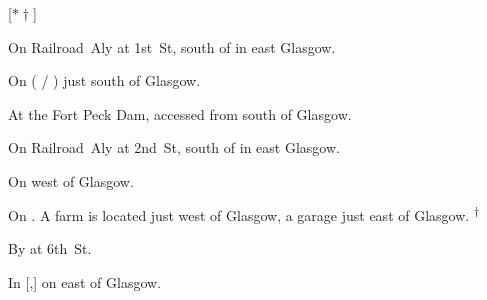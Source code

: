 
[$\ast\dagger$]

\begin{LocationList}

On Railroad~Aly at 1st~St, south of  in east Glasgow.

On  ( / ) just south of Glasgow.

At the Fort Peck Dam, accessed from 
south of Glasgow.

On Railroad~Aly at 2nd~St, south of  in east Glasgow.

\Location{\RestArea \Rest}
On 
west of Glasgow.

On .
A farm is located just west of Glasgow, a garage just east of Glasgow.%
\textsuperscript{\scriptsize $\dagger$}

By  at 6th~St.

\Location{\TruckStop \Gas \Rest}
In [,] on 
east of Glasgow.

\end{LocationList}
